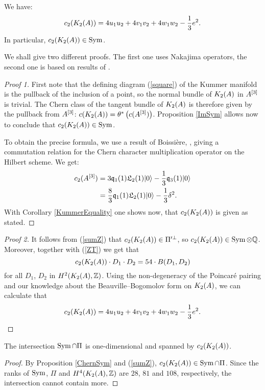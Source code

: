 \begin{proposition} \label{ChernSym}
We have:
\begin{equation}
c_2(K_{ 2 }( A ))= 4 u_1u_2 + 4v_1v_2 + 4 w_1 w_2 - \frac{1}{3} e^2. 
\end{equation}
In particular, $c_2(K_{ 2 }( A ))\in \operatorname{Sym} $.
\end{proposition}
We shall give two different proofs. The first one uses Nakajima operators, the second one is based on results of \cite{Hassett}.
\begin{proof}[Proof 1]
First note that the defining diagram (\ref{square}) of the Kummer manifold is the pullback of the inclusion of a point, so the normal bundle of $K_{ 2 }( A )$ in $A^{[3]}$ is trivial. The Chern class of the tangent bundle of $K_{ 2 }( A )$ is therefore given by the pullback from $A^{[3]}$: $c(K_{ 2 }( A )) = \theta^*\left(c(A^{[3]})\right)$. Proposition \ref{ImSym} allows now to conclude that $c_2(K_{ 2 }( A ))\in \operatorname{Sym}$.

To obtain the precise formula, we use a result of Boissi\`ere, \cite[Lemma 3.12]{Boissiere}, giving a commutation relation for the Chern character multiplication operator on the Hilbert scheme. We get:
\begin{align*}
c_2(A^{[3]}) & = 3\mathfrak{q}_1(1)\mathfrak L_2(1)|0\rangle - \frac{1}{3} \mathfrak{q}_3(1)|0\rangle \\
 & =\frac{8}{3}\mathfrak{q}_1(1)\mathfrak L_2(1)|0\rangle - \frac{1}{3} \delta^2 .
\end{align*}
With Corollary \ref{KummerEquality} one shows now, that $c_2(K_{ 2 }( A ))$ is given as stated.
\end{proof}
\begin{proof}[Proof 2]
It follows from (\ref{sumZ}) that $c_2(K_{ 2 }( A ))\in \Pi'^\perp$, so $c_2(K_{ 2 }( A )) \in \operatorname{Sym}\otimes\mathbb{Q}$. Moreover, together with (\ref{ZT}) we get that
\begin{equation*}
c_2(K_{ 2 }( A ))\cdot D_{1}\cdot D_{2}=54\cdot B(D_{1},D_{2})
\end{equation*}
for all $D_{1}$, $D_{2}$ in $H^{2}(K_{ 2 }( A ),\mathbb{Z})$. Using the non-degeneracy of the Poincar\'e pairing and our knowledge about the Beauville--Bogomolov form on $K_{ 2 }( A )$, we can calculate that
$$
c_2(K_{ 2 }( A ))= 4 u_1u_2 + 4v_1v_2 + 4 w_1 w_2 - \frac{1}{3} e^2.  \qedhere
$$
\end{proof}


\begin{corollary}\label{Pi'}
The intersection $\operatorname{Sym}\cap \Pi$ is one-dimensional and spanned by $c_2(K_{ 2 }( A ))$. 
\end{corollary}
\begin{proof}
By Proposition \ref{ChernSym} and (\ref{sumZ}), $c_2(K_{ 2 }( A ))\in \operatorname{Sym}\cap \Pi$. Since the ranks of $\operatorname{Sym}$, $\Pi$ and $H^4(K_{ 2 }( A ),\mathbb{Z})$ are $28$, $81$ and $108$, respectively, the intersection cannot contain more.
\end{proof}

